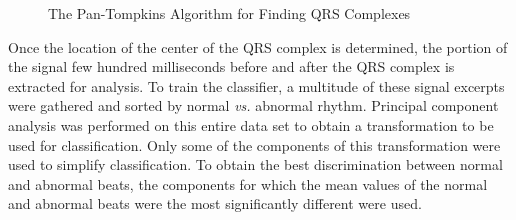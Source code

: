 \documentclass[titlepage,12pt,letter]{article}
\begin{document}
\begin{figure}[hbtp]
    \centering
    \caption{The Pan-Tompkins Algorithm for Finding QRS Complexes}
    \label{fig:pan}
\end{figure}

Once the location of the center of the QRS complex is determined, the portion of
the signal few hundred milliseconds before and after the QRS complex is
extracted for analysis.  To train the classifier, a multitude of these signal
excerpts were gathered and sorted by normal \textit{vs.} abnormal rhythm.
Principal component analysis was performed on this entire data set to obtain a
transformation to be used for classification.  Only some of the components of
this transformation were used to simplify classification.  To obtain the best
discrimination between normal and abnormal beats, the components for which the
mean values of the normal and abnormal beats were the most significantly
different were used.  
\end{document}
